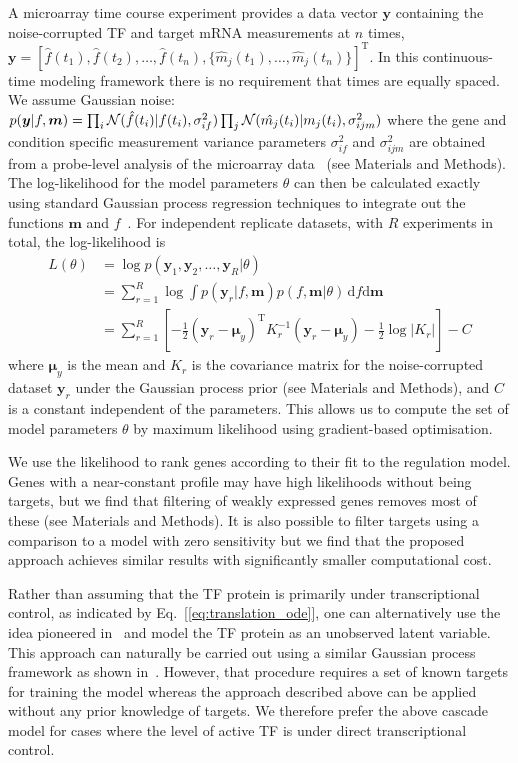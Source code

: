 \documentclass{pnastwo}
\begin{document}
\begin{article}
A microarray time course experiment provides a data vector $\bm y$ containing the noise-corrupted TF and target mRNA
measurements at $n$ times,
$\bm
y=[\hat{f}(t_1),\hat{f}(t_2),\ldots,\hat{f}(t_n),\{\hat{m}_j(t_1),\ldots,\hat{m}_j(t_n)\}]^\mathrm{T}$.
In this continuous-time modeling framework there is no
requirement that times are equally spaced. We assume Gaussian noise:
$p(\bm y|f,\bm m)=\prod_i{\cal
  N}(\hat{f}(t_i)|f(t_i),\sigma_{if}^2)\prod_j{\cal
  N}(\hat{m_j}(t_i)|m_j(t_i),\sigma_{ijm}^2)$ where the gene and condition
specific measurement variance parameters $\sigma_{if}^2$ and
$\sigma_{ijm}^2$ are obtained from a probe-level analysis of the
microarray data~\cite{Liu2005,Pearson2009} (see
Materials and Methods). The log-likelihood for the model parameters
$\theta$ can then be calculated exactly using standard Gaussian process regression
techniques to integrate out the functions $\bm m$ and
$f$~\cite{Rasmussen2006}. For independent replicate datasets, with
$R$ experiments in total, the
log-likelihood is
\begin{equation*}
  \begin{split}
    L(\theta) & = \log p(\bm y_1,\bm y_2,\ldots,\bm y_{R}|\theta) \\
    & = \sum_{r=1}^{R} \log \!\int 
    \!\!p(\bm y_r|f,\bm m)p(f,\bm m|\theta) \, \mathrm{d}\!f\mathrm{d}\bm m\\
    & = \sum_{r=1}^{R} \left[-\frac{1}{2}(\bm y_r - \bm \mu_y)^\mathrm{T} K_r^{-1} (\bm y_r - \bm \mu_y) -
      \frac{1}{2}\log|K_r|\right] -C      %
  \end{split}
\end{equation*}
where $\bm \mu_y$ is the mean and $K_r$ is the covariance matrix for the
noise-corrupted dataset $\bm y_r$ under the Gaussian process prior (see
Materials and Methods), and $C$ is a constant independent of the
parameters.  This allows us to compute the set of model
parameters $\theta$ by maximum
likelihood using gradient-based optimisation. 

We use the likelihood to rank genes according to their fit to the
regulation model. Genes with a
near-constant profile may have high likelihoods without being targets,
but we find that filtering of weakly expressed genes removes most of
these (see Materials and Methods). It is also possible to filter
targets using a comparison to a model with
zero sensitivity but we find that the proposed approach achieves
similar results with significantly smaller computational cost.

Rather than assuming that the TF protein is primarily under
transcriptional control, as indicated by
Eq.~[\ref{eq:translation_ode}], one can alternatively use the idea pioneered
in~\cite{Barenco2006a,Khanin2006} and model the TF protein as an unobserved
latent variable. This approach can naturally be carried out using a
similar Gaussian process framework as shown in~\cite{Gao2008}. However, that procedure requires a set of known
targets for training the model whereas the approach described above
can be applied without any prior knowledge of targets. We therefore
prefer the above cascade model for cases where the level of active TF is under direct transcriptional control. 


\end{article}
\end{document}
